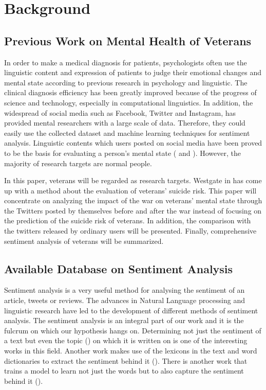 \section{Background}

\subsection{Previous Work on Mental Health of Veterans}

In order to make a medical diagnosis for patients, psychologists often use the
linguistic content and expression of patients to judge their emotional changes
and mental state according to previous research in psychology and linguistic.
The clinical diagnosis efficiency has been greatly improved because of the
progress of science and technology, especially in computational linguistics.
In addition, the widespread of social media such as Facebook, Twitter and
Instagram, has provided mental researchers with a large scale of data.
Therefore, they could easily use the collected dataset and machine learning
techniques for sentiment analysis. Linguistic contents which users posted on
social media have been proved to be the basis for evaluating a person's mental
state (\cite{becauseIwastoldsomuch} and \cite{GUNTUKU201743}). However,
the majority of research targets are normal people.

In this paper, veterans will be regarded as research targets. Westgate in
\cite{doi:10.1176/appi.ps.201400283} has come up with a method about the evaluation
of veterans' suicide risk. This paper will concentrate on analyzing
the impact of the war on veterans' mental state through the Twitters posted by
themselves before and after the war instead of focusing on the prediction of
the suicide risk of veterans. In addition, the comparison with the twitters
released by ordinary users will be presented. Finally, comprehensive
sentiment analysis of veterans will be summarized.

\subsection{Available Database on Sentiment Analysis}

Sentiment analysis is a very useful method for analysing the sentiment of an
article, tweets or reviews. The advances in Natural Language processing and
linguistic research have led to the development of different methods of
sentiment analysis. The sentiment analysis is an integral part of our work and
it is the fulcrum on which our hypothesis hangs on. Determining not just the
sentiment of a text but even the topic (\cite{10.1145/1645953.1646003}) on which
it is written on is one of the interesting works in this field. Another work
makes use of the lexicons in the text and word dictionaries to extract the
sentiment behind it (\cite{10.5555/2002472.2002491}). There is another work that
trains a model to learn not just the words but to also capture the sentiment
behind it (\cite{taboada2011lexicon}).

